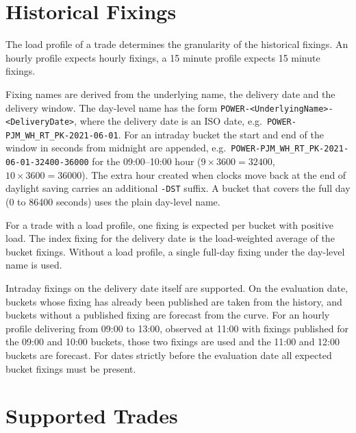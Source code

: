 \documentclass[12pt, a4paper]{article}
\begin{document}


\section{Historical Fixings}

The load profile of a trade determines the granularity of the historical fixings. An hourly profile expects hourly
fixings, a 15 minute profile expects 15 minute fixings.

Fixing names are derived from the underlying name, the delivery date and the delivery window. The day-level name has
the form \lstinline!POWER-<UnderlyingName>-<DeliveryDate>!, where the delivery date is an ISO date, e.g.\
\lstinline!POWER-PJM_WH_RT_PK-2021-06-01!. For an intraday bucket the start and end of the window in seconds from
midnight are appended, e.g.\ \lstinline!POWER-PJM_WH_RT_PK-2021-06-01-32400-36000! for the 09:00--10:00 hour
($9 \times 3600 = 32400$, $10 \times 3600 = 36000$). The extra hour created when clocks move back at the end of
daylight saving carries an additional \lstinline!-DST! suffix. A bucket that covers the full day (0 to 86400 seconds)
uses the plain day-level name.

For a trade with a load profile, one fixing is expected per bucket with positive load. The index fixing for the
delivery date is the load-weighted average of the bucket fixings. Without a load profile, a single full-day fixing
under the day-level name is used.

Intraday fixings on the delivery date itself are supported. On the evaluation date, buckets whose fixing has already
been published are taken from the history, and buckets without a published fixing are forecast from the curve. For an
hourly profile delivering from 09:00 to 13:00, observed at 11:00 with fixings published for the 09:00 and 10:00
buckets, those two fixings are used and the 11:00 and 12:00 buckets are forecast. For dates strictly before the
evaluation date all expected bucket fixings must be present.

\section{Supported Trades}
\end{document}
